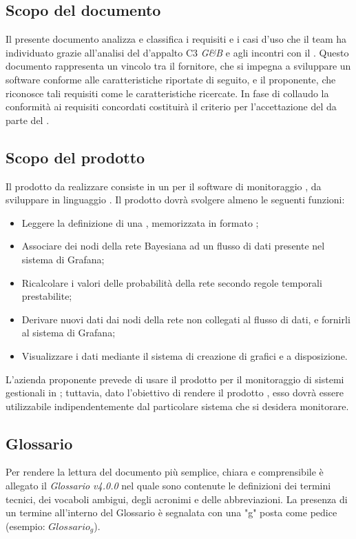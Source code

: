 \subsection{Scopo del documento}
Il presente documento analizza e classifica i requisiti e i casi d'uso che il team ha individuato grazie all'analisi del  d'appalto C3 \emph{G\&B} e agli incontri con il .
Questo documento rappresenta un vincolo tra il fornitore, che si impegna a sviluppare un
software conforme alle caratteristiche riportate di seguito, e il proponente, che riconosce tali
requisiti come le caratteristiche ricercate.
In fase di collaudo la conformità ai requisiti concordati costituirà il criterio per l'accettazione
del  da parte del .
\subsection{Scopo del prodotto}
Il prodotto da realizzare consiste in un  per il software di monitoraggio , da sviluppare in linguaggio . Il prodotto dovrà svolgere almeno le seguenti funzioni:
\begin{itemize}
	\item{Leggere la definizione di una , memorizzata in formato ;}
	\item{Associare dei nodi della rete Bayesiana ad un flusso di dati presente nel sistema di Grafana;}
	\item{Ricalcolare i valori delle probabilità della rete secondo regole temporali prestabilite;}
	\item{Derivare nuovi dati dai nodi della rete non collegati al flusso di dati, e fornirli al sistema di Grafana;}
	\item{Visualizzare i dati mediante il sistema di creazione di grafici e  a disposizione.}
\end{itemize}
L'azienda proponente prevede di usare il prodotto per il monitoraggio di sistemi gestionali in ; tuttavia, dato l'obiettivo di rendere il prodotto , esso dovrà essere utilizzabile indipendentemente dal particolare sistema che si desidera monitorare.
\subsection{Glossario}
Per rendere la lettura del documento più semplice, chiara e comprensibile è allegato il \emph{Glossario v4.0.0} nel quale sono contenute le definizioni dei termini tecnici, dei vocaboli ambigui, degli acronimi e delle abbreviazioni. La presenza di un termine all'interno del Glossario è segnalata con una "g" posta come pedice (esempio: $Glossario_{g}$).
